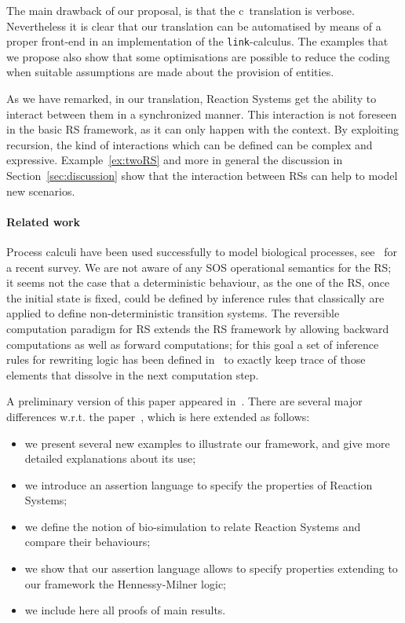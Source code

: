 The main drawback of our proposal, is that the c\CNA \ translation is
verbose. Nevertheless it is clear that our
translation can be automatised by means of a proper front-end in
an implementation of the {\tt link}-calculus. 
The examples that we propose also show that some optimisations are possible
to reduce the coding when suitable assumptions are made about the provision of entities.

As we have remarked, in our translation, Reaction Systems 
get the ability to interact between them in a synchronized manner. 
This interaction is not foreseen in
the basic RS framework, as it can only happen with the context.
By exploiting recursion, the kind of interactions which can be 
defined can be complex and expressive.
Example~\ref{ex:twoRS} and more in general the discussion in 
Section~\ref{sec:discussion} show that 
the interaction between RSs can help to model new scenarios.

\paragraph{Related work}

Process calculi have been used successfully to model
biological processes, see~\cite{BBDFH18} for a recent survey.
We are not aware of any SOS operational semantics for the RS; it seems not the case
that a deterministic behaviour, as the one of the RS, once the initial state is 
fixed, could be defined by inference rules that classically are applied 
to define non-deterministic transition systems.
The reversible computation paradigm for RS extends the RS framework  by
allowing  backward computations as well as forward computations; for this 
goal a set of inference rules for rewriting logic has been 
defined in~\cite{10.1007/978-3-319-73359-3_3}
to exactly keep trace of those elements that  dissolve in the next 
computation step.


A preliminary version of this paper appeared in~\cite{BBF19}.
There are several major differences w.r.t. the paper~\cite{BBF19}, which is here extended as follows:
\begin{itemize}
\item we present several new examples to illustrate our framework,
and give more detailed explanations about its use;
\item we introduce an assertion language to specify the properties of Reaction Systems;
\item we define the notion of bio-simulation to relate Reaction Systems and compare their behaviours;
\item we show that our assertion language allows to specify properties extending to our
framework the Hennessy-Milner logic;
\item we include here all proofs of main results.
\end{itemize}
 
